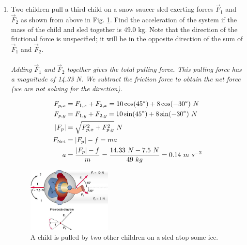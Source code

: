 \documentclass[10pt]{article}
\begin{document}
\begin{enumerate}
\item Two children pull a third child on a snow saucer sled exerting forces $\vec{F}_1$ and $\vec{F}_2$ as shown from above in Fig. \ref{fig:1}.  Find the acceleration of the system if the mass of the child and sled together is 49.0 kg. Note that the direction of the frictional force is unspecified; it will be in the opposite direction of the sum of $\vec{F}_1$ and $\vec{F}_2$. \\ \\

\textit{Adding $\vec{F}_1$ and $\vec{F}_2$ together gives the total pulling force.  This pulling force has a magnitude of 14.33 N.  We subtract the friction force to obtain the net force (we are not solving for the direction).}

\begin{align}
F_{p,x} &= F_{1,x} + F_{2,x}  = 10\cos(45^{\circ}) + 8\cos(-30^{\circ}) ~N\\
F_{p,y} &= F_{1,y} + F_{2,y}  = 10\sin(45^{\circ}) + 8\sin(-30^{\circ}) ~N\\
|F_p| &= \sqrt{F_{p,x}^2 + F_{p,y}^2} ~N\\
F_{\rm Net} &= |F_p| - f = m a \\
a &= \frac{|F_p| - f}{m} = \frac{14.33 ~N - 7.5 ~N}{49 ~kg} = 0.14 ~m ~s^{-2}
\end{align}

\begin{figure}[hb]
\centering
\includegraphics[width=0.4\textwidth]{child.jpeg}
\caption{\label{fig:1} A child is pulled by two other children on a sled atop some ice.}
\end{figure}
\end{enumerate}
\end{document}
